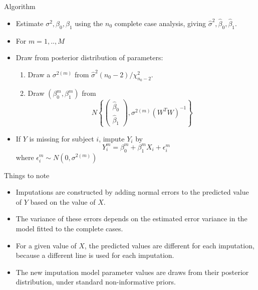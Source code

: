 \documentclass[ignorenonframetext,]{beamer}
\providecommand{\tightlist}{%
  \setlength{\itemsep}{0pt}\setlength{\parskip}{0pt}}
\begin{document}
\begin{frame}{Algorithm}
\protect\hypertarget{algorithm}{}

\begin{itemize}
\tightlist
\item
  Estimate \(\sigma^{2},\beta_{0},\beta_{1}\) using the \(n_{0}\)
  complete case analysis, giving
  \(\hat{\sigma}^{2},\hat{\beta}_{0},\hat{\beta}_{1}\).
\item
  For \(m=1,..,M\)
\item
  Draw from posterior distribution of parameters:

  \begin{enumerate}
  \tightlist
  \item
    Draw a \(\sigma^{2(m)}\) from
    \(\hat\sigma^2 (n_0-2) / \chi^2_{n_0-2}.\)
  \item
    Draw \((\beta^{m}_0,\beta^{m}_1)\) from \[N \left\{ 
      \begin{pmatrix}\hat\beta_0 \\\hat\beta_1 \end{pmatrix},
      \sigma^{2(m)} (W^TW)^{-1} \right\}
      \]
  \end{enumerate}
\item
  If \(Y\) is missing for subject \(i\), impute \(Y_{i}\) by \[
  Y^{m}_{i} = \beta^{m}_{0} + \beta^{m}_{1} X_{i} + \epsilon^{m}_{i}
  \] where \(\epsilon^{m}_{i} \sim N(0, \sigma^{2(m)})\)
\end{itemize}

\end{frame}

\begin{frame}{Things to note}
\protect\hypertarget{things-to-note}{}

\begin{itemize}
\tightlist
\item
  Imputations are constructed by adding normal errors to the predicted
  value of \(Y\) based on the value of \(X\).
\item
  The variance of these errors depends on the estimated error variance
  in the model fitted to the complete cases.
\item
  For a given value of \(X\), the predicted values are different for
  each imputation, because a different line is used for each imputation.
\item
  The new imputation model parameter values are draws from their
  posterior distribution, under standard non-informative priors.
\end{itemize}

\end{frame}
\end{document}

